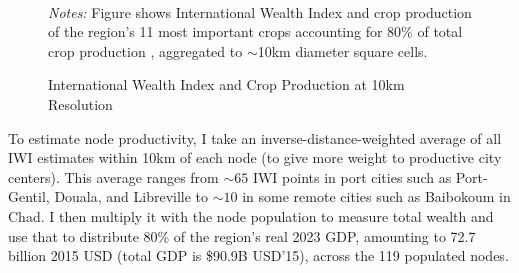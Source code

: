 \documentclass[a4paper]{article}
\begin{document}
\begin{figure}[H] \vspace{-4mm}
\centering
\caption{\label{fig:IWISPAM} International Wealth Index and Crop Production at 10km Resolution}
\\\vspace{-2mm}
\raggedright
\scriptsize 
\emph{Notes:} Figure shows International Wealth Index \citep{lee2022high} and crop production of the region's 11 most important crops accounting for 80\% of total crop production \citep{SPAM}, aggregated to $\sim$10km diameter square cells.
\end{figure}

  To estimate node productivity, I take an inverse-distance-weighted average of all IWI estimates within 10km of each node (to give more weight to productive city centers). This average ranges from $\sim 65$ IWI points in port cities such as Port-Gentil, Douala, and Libreville to $\sim 10$ in some remote cities such as Baibokoum in Chad. I then multiply it with the node population to measure total wealth and use that to distribute 80\% of the region's real 2023 GDP, amounting to 72.7 billion 2015 USD (total GDP is \$90.9B USD'15), across the 119 populated nodes. \newline 
  
\end{document}
